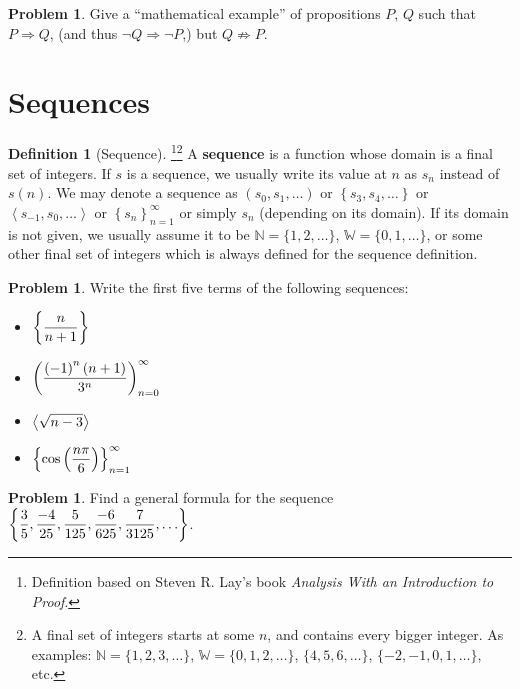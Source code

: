 \documentclass[letterpaper, twoside, 12pt]{book}
\theoremstyle{definition}
\theoremstyle{definition}
\newtheorem{definition}[theorem]{Definition}
\newtheorem{problem}[theorem]{Problem}
\newcommand{\ds}{\ensuremath{\displaystyle}}
\begin{document}
\vfill

\begin{problem}
  Give a ``mathematical example'' of propositions $P$, $Q$ such that $P\Rightarrow Q$,
  (and thus $\neg Q\Rightarrow \neg P$,) but $Q\not\Rightarrow P$.
\end{problem}

\vfill

\newpage

\section{Sequences}

\begin{definition}[Sequence]\footnote{
Definition based on Steven R. Lay's book \emph{Analysis With an Introduction to
Proof}.
}\footnote{
A final set of integers starts at some $n$, and contains every bigger integer.
As examples: $\mathbb{N}=\{1,2,3,\dots\}$, $\mathbb{W}=\{0,1,2,\dots\}$,
$\{4,5,6,\dots\}$, $\{-2,-1,0,1,\dots\}$, etc.
}
 A \textbf{sequence} is a function whose domain is a final set of integers.
 If $s$ is a sequence, we usually write its value at
 $n$ as $s_n$ instead of $s(n)$.  We may denote a sequence as
 $\left( s_0,s_1, \ldots \right)$ or
 $\left\{ s_3,s_4, \ldots \right\}$ or
 $\left\langle s_{-1},s_0, \ldots \right\rangle$ or
 $\left\{ s_n \right\}_{n = 1}^{\infty}$
 or simply $s_n$ (depending on its domain).
 If its domain is not given, we usually assume it to be
 $\mathbb{N}=\{1,2,\dots\}$, $\mathbb{W}=\{0,1,\dots\}$, or some other final
 set of integers which is always defined for the sequence definition.
\end{definition}

\begin{problem}
 Write the first five terms of the following sequences:
 \begin{itemize}
  \item $\ds \left\{ \frac{n}{n+1} \right\}$
  \item $\ds \left( \frac{\left(-1\right)^n \left(n+1\right)}{3^n} \right)_{n=0}^{\infty}$
  \item $\ds \left\langle \sqrt{n-3} \right\rangle$
  \item $\ds \left\{ \cos\left(\frac{n\pi}{6}\right) \right\}_{n=1}^\infty$
 \end{itemize}
\end{problem}

\vfill

\begin{problem}
 Find a general formula for the sequence
 $
  \ds \left\{
  \frac{3}{5},
  \frac{-4}{25},
  \frac{5}{125},
  \frac{-6}{625},
  \frac{7}{3125},
  \ldots \right\}
 $.
\end{problem}
\end{document}
